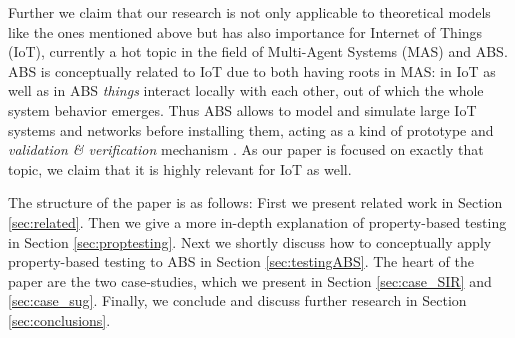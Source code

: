 
Further we claim that our research is not only applicable to theoretical models like the ones mentioned above but has also importance for Internet of Things (IoT), currently a hot topic in the field of Multi-Agent Systems (MAS) and ABS. ABS is conceptually related to IoT due to both having roots in MAS: in IoT as well as in ABS \textit{things} interact locally with each other, out of which the whole system behavior emerges. Thus ABS allows to model and simulate large IoT systems and networks before installing them, acting as a kind of prototype and \textit{validation \& verification} mechanism . As our paper is focused on exactly that topic, we claim that it is highly relevant for IoT as well.

The structure of the paper is as follows: First we present related work in Section \ref{sec:related}. Then we give a more in-depth explanation of property-based testing in Section \ref{sec:proptesting}. Next we shortly discuss how to conceptually apply property-based testing to ABS in Section \ref{sec:testingABS}. The heart of the paper are the two case-studies, which we present in Section \ref{sec:case_SIR} and \ref{sec:case_sug}. Finally, we conclude and discuss further research in Section \ref{sec:conclusions}.